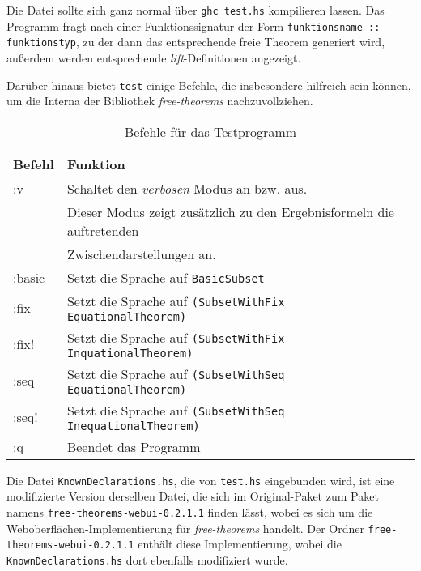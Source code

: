 Die Datei sollte sich ganz normal über \texttt{ghc test.hs} kompilieren lassen. Das Programm fragt nach einer
Funktionssignatur der Form \texttt{funktionsname :: funktionstyp}, zu der dann das entsprechende freie Theorem
generiert wird, außerdem werden entsprechende \textit{lift}-Definitionen angezeigt.

Darüber hinaus bietet \texttt{test} einige Befehle, die insbesondere hilfreich sein können, um die Interna der
Bibliothek \textit{free-theorems} nachzuvollziehen.

\begin{table}[ht]
\begin{tabular}{ | l | l | }
\hline
Befehl & Funktion \\
\hline
:v & Schaltet den \textit{verbosen} Modus an bzw. aus.\\
& Dieser Modus zeigt zusätzlich zu den Ergebnisformeln die auftretenden \\
& Zwischendarstellungen an. \\
:basic & Setzt die Sprache auf \texttt{BasicSubset} \\
:fix & Setzt die Sprache auf \texttt{(SubsetWithFix EquationalTheorem)} \\
:fix! & Setzt die Sprache auf \texttt{(SubsetWithFix InquationalTheorem)} \\
:seq & Setzt die Sprache auf \texttt{(SubsetWithSeq EquationalTheorem)} \\
:seq! & Setzt die Sprache auf \texttt{(SubsetWithSeq InequationalTheorem)} \\
:q & Beendet das Programm \\
\hline
\end{tabular}
\caption{Befehle für das Testprogramm}
\label{tab:commands}
\end{table}

Die Datei \texttt{KnownDeclarations.hs}, die von \texttt{test.hs} eingebunden wird, ist eine modifizierte Version
derselben Datei, die sich im Original-Paket zum Paket namens \texttt{free-theorems-webui-0.2.1.1} finden lässt, wobei es sich um
die Weboberflächen-Implementierung für \textit{free-theorems} handelt. Der Ordner
\texttt{free-theorems-webui-0.2.1.1} enthält diese Implementierung, wobei die \texttt{KnownDeclarations.hs} dort
ebenfalls modifiziert wurde.
